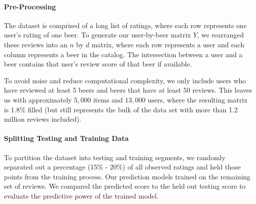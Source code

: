 \documentclass[12pt]{article}
\begin{document}

\paragraph{Pre-Processing}
The dataset is comprised of a long list of ratings, where each row represents one user's rating of one beer. To generate our user-by-beer matrix $Y$, we rearranged these reviews into an $n$ by $d$ matrix, where each row represents a user and each column represents a beer in the catalog. The intersection between a user and a beer contains that user's review score of that beer if available.

To avoid noise and reduce computational complexity, we only include users who have reviewed at least 5 beers and beers that have at least 50 reviews. This leaves us with approximately $5,000$ items and $13,000$ users, where the resulting matrix is 1.8\% filled (but still represents the bulk of the data set with more than 1.2 million reviews included).





\paragraph{Splitting Testing and Training Data} To partition the dataset into testing and training segments, we randomly separated out a percentage (15\% - 20\%) of all observed ratings and held those points from the training process. Our prediction models trained on the remaining set of reviews. We compared the predicted score to the held out testing score to evaluate the predictive power of the trained model.
\end{document}
